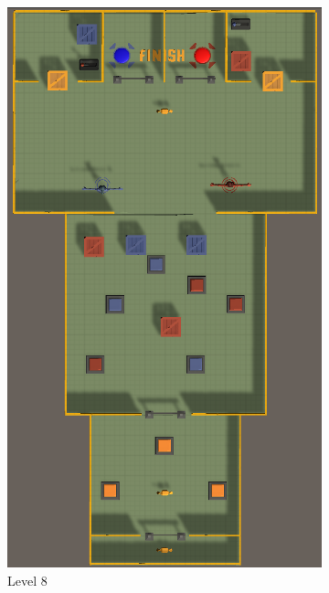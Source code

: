 \begin{figure}[h!]
    \begin{subfigure}[b]{0.45\linewidth}
        \includegraphics[width=\linewidth]{images/level_8.png}
        \caption{Level 8}
        \label{fig:level 8}
      \end{subfigure}
    \begin{subfigure}[b]{0.45\linewidth}

\end{subfigure}
\end{figure}
